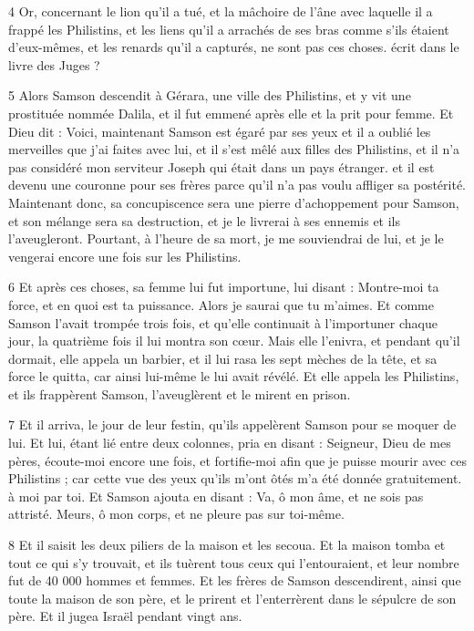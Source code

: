 \par 4 Or, concernant le lion qu'il a tué, et la mâchoire de l'âne avec laquelle il a frappé les Philistins, et les liens qu'il a arrachés de ses bras comme s'ils étaient d'eux-mêmes, et les renards qu'il a capturés, ne sont pas ces choses. écrit dans le livre des Juges ?

\par 5 Alors Samson descendit à Gérara, une ville des Philistins, et y vit une prostituée nommée Dalila, et il fut emmené après elle et la prit pour femme. Et Dieu dit : Voici, maintenant Samson est égaré par ses yeux et il a oublié les merveilles que j'ai faites avec lui, et il s'est mêlé aux filles des Philistins, et il n'a pas considéré mon serviteur Joseph qui était dans un pays étranger. et il est devenu une couronne pour ses frères parce qu'il n'a pas voulu affliger sa postérité. Maintenant donc, sa concupiscence sera une pierre d'achoppement pour Samson, et son mélange sera sa destruction, et je le livrerai à ses ennemis et ils l'aveugleront. Pourtant, à l'heure de sa mort, je me souviendrai de lui, et je le vengerai encore une fois sur les Philistins.

\par 6 Et après ces choses, sa femme lui fut importune, lui disant : Montre-moi ta force, et en quoi est ta puissance. Alors je saurai que tu m'aimes. Et comme Samson l'avait trompée trois fois, et qu'elle continuait à l'importuner chaque jour, la quatrième fois il lui montra son cœur. Mais elle l'enivra, et pendant qu'il dormait, elle appela un barbier, et il lui rasa les sept mèches de la tête, et sa force le quitta, car ainsi lui-même le lui avait révélé. Et elle appela les Philistins, et ils frappèrent Samson, l'aveuglèrent et le mirent en prison.

\par 7 Et il arriva, le jour de leur festin, qu'ils appelèrent Samson pour se moquer de lui. Et lui, étant lié entre deux colonnes, pria en disant : Seigneur, Dieu de mes pères, écoute-moi encore une fois, et fortifie-moi afin que je puisse mourir avec ces Philistins ; car cette vue des yeux qu'ils m'ont ôtés m'a été donnée gratuitement. à moi par toi. Et Samson ajouta en disant : Va, ô mon âme, et ne sois pas attristé. Meurs, ô mon corps, et ne pleure pas sur toi-même.

\par 8 Et il saisit les deux piliers de la maison et les secoua. Et la maison tomba et tout ce qui s'y trouvait, et ils tuèrent tous ceux qui l'entouraient, et leur nombre fut de 40 000 hommes et femmes. Et les frères de Samson descendirent, ainsi que toute la maison de son père, et le prirent et l'enterrèrent dans le sépulcre de son père. Et il jugea Israël pendant vingt ans.

